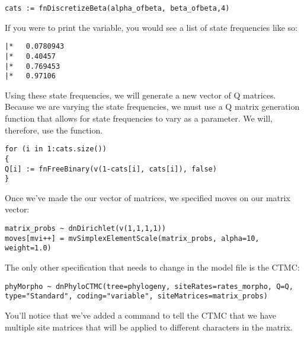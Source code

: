 {\tt \begin{snugshade*}
\begin{lstlisting}
cats := fnDiscretizeBeta(alpha_ofbeta, beta_ofbeta,4)
\end{lstlisting}
\end{snugshade*}}

If you were to print the  variable, you would see a list of state frequencies like so:

{\tiny{\tt \begin{snugshade*}
\begin{lstlisting}
|*   0.0780943
|*   0.40457
|*   0.769453
|*   0.97106
\end{lstlisting}
\end{snugshade*}}}

Using these state frequencies, we will generate a new vector of Q matrices.
Because we are varying the state frequencies, we must use a Q matrix generation function that allows for state frequencies to vary as a parameter.
We will, therefore, use the  function.

{\tt \begin{snugshade*}
\begin{lstlisting}
for (i in 1:cats.size())
{
Q[i] := fnFreeBinary(v(1-cats[i], cats[i]), false)
}
\end{lstlisting}
\end{snugshade*}}

Once we've made the our vector of matrices, we specified moves on our matrix vector:
{\tt \begin{snugshade*}
\begin{lstlisting}
matrix_probs ~ dnDirichlet(v(1,1,1,1))
moves[mvi++] = mvSimplexElementScale(matrix_probs, alpha=10, weight=1.0) 
\end{lstlisting}
\end{snugshade*}}

The only other specification that needs to change in the model file is the CTMC:
{\tt \begin{snugshade*}
\begin{lstlisting}
phyMorpho ~ dnPhyloCTMC(tree=phylogeny, siteRates=rates_morpho, Q=Q, type="Standard", coding="variable", siteMatrices=matrix_probs)
\end{lstlisting}
\end{snugshade*}}

You'll notice that we've added a command to tell the CTMC that we have multiple site matrices that will be applied to different characters in the matrix.

